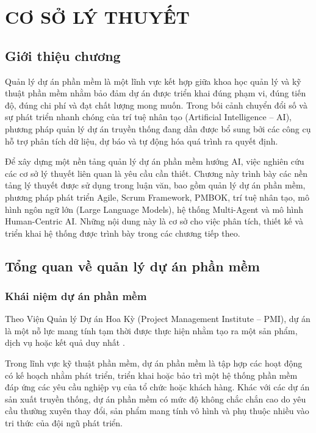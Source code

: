 \documentclass[12pt,a4paper]{report}
\begin{document}
\chapter{CƠ SỞ LÝ THUYẾT}
\label{chap:background}

\section{Giới thiệu chương}

Quản lý dự án phần mềm là một lĩnh vực kết hợp giữa khoa học quản lý và kỹ thuật phần mềm nhằm bảo đảm dự án được triển khai đúng phạm vi, đúng tiến độ, đúng chi phí và đạt chất lượng mong muốn. Trong bối cảnh chuyển đổi số và sự phát triển nhanh chóng của trí tuệ nhân tạo (Artificial Intelligence -- AI), phương pháp quản lý dự án truyền thống đang dần được bổ sung bởi các công cụ hỗ trợ phân tích dữ liệu, dự báo và tự động hóa quá trình ra quyết định.

Để xây dựng một nền tảng quản lý dự án phần mềm hướng AI, việc nghiên cứu các cơ sở lý thuyết liên quan là yêu cầu cần thiết. Chương này trình bày các nền tảng lý thuyết được sử dụng trong luận văn, bao gồm quản lý dự án phần mềm, phương pháp phát triển Agile, Scrum Framework, PMBOK, trí tuệ nhân tạo, mô hình ngôn ngữ lớn (Large Language Models), hệ thống Multi-Agent và mô hình Human-Centric AI. Những nội dung này là cơ sở cho việc phân tích, thiết kế và triển khai hệ thống được trình bày trong các chương tiếp theo.
\section{Tổng quan về quản lý dự án phần mềm}

\subsection{Khái niệm dự án phần mềm}
Theo Viện Quản lý Dự án Hoa Kỳ (Project Management Institute -- PMI), dự án là một nỗ lực mang tính tạm thời được thực hiện nhằm tạo ra một sản phẩm, dịch vụ hoặc kết quả duy nhất \cite{pmbok7}.

Trong lĩnh vực kỹ thuật phần mềm, dự án phần mềm là tập hợp các hoạt động có kế hoạch nhằm phát triển, triển khai hoặc bảo trì một hệ thống phần mềm đáp ứng các yêu cầu nghiệp vụ của tổ chức hoặc khách hàng. Khác với các dự án sản xuất truyền thống, dự án phần mềm có mức độ không chắc chắn cao do yêu cầu thường xuyên thay đổi, sản phẩm mang tính vô hình và phụ thuộc nhiều vào tri thức của đội ngũ phát triển.
\end{document}
